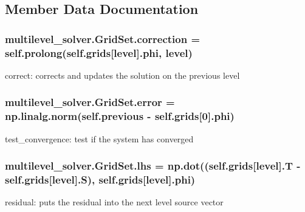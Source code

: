 \subsection{Member Data Documentation}
\subsubsection[{correction}]{\setlength{\rightskip}{0pt plus 5cm}multilevel\+\_\+solver.\+Grid\+Set.\+correction = self.\+prolong(self.\+grids[level].{\bf phi}, level)\hspace{0.3cm}{\ttfamily [static]}}\label{classmultilevel__solver_1_1_grid_set_aae1405c5f4ea1b3d0a28f2bbbb1461fb}
\begin{DoxyVerb}correct: corrects and updates the solution on the previous level\end{DoxyVerb}
\subsubsection[{error}]{\setlength{\rightskip}{0pt plus 5cm}multilevel\+\_\+solver.\+Grid\+Set.\+error = np.\+linalg.\+norm(self.\+previous -\/ self.\+grids[0].{\bf phi})\hspace{0.3cm}{\ttfamily [static]}}\label{classmultilevel__solver_1_1_grid_set_adf738b523c2cf33c3768c69040c380ef}
\begin{DoxyVerb}test_convergence: test if the system has converged\end{DoxyVerb}
\subsubsection[{lhs}]{\setlength{\rightskip}{0pt plus 5cm}multilevel\+\_\+solver.\+Grid\+Set.\+lhs = np.\+dot((self.\+grids[level].{\bf T} -\/ self.\+grids[level].S), self.\+grids[level].{\bf phi})\hspace{0.3cm}{\ttfamily [static]}}\label{classmultilevel__solver_1_1_grid_set_aec4b52672b82fd48fb63078f6b05ed02}
\begin{DoxyVerb}residual: puts the residual into the next level source vector\end{DoxyVerb}
